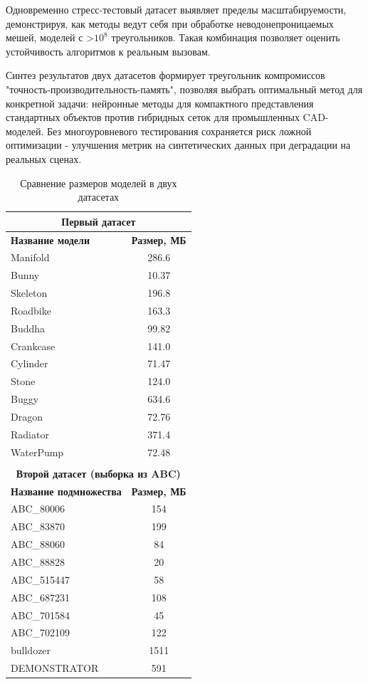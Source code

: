 \documentclass[a4paper,hidelinks,12pt]{article}
\begin{document}
Одновременно стресс-тестовый датасет выявляет пределы масштабируемости, демонстрируя, как методы ведут себя при обработке 
неводонепроницаемых мешей, моделей с >$10^8$ треугольников. Такая комбинация позволяет оценить устойчивость алгоритмов к реальным вызовам.

Синтез результатов двух датасетов формирует треугольник компромиссов "точность-производительность-память", 
позволяя выбрать оптимальный метод для конкретной задачи: нейронные методы для компактного представления стандартных 
объектов против гибридных сеток для промышленных CAD-моделей. Без многоуровневого тестирования сохраняется риск 
ложной оптимизации - улучшения метрик на синтетических данных при деградации на реальных сценах.

\begin{table}[h!]
	\centering
	\begin{tabular}{|l|c|}
			\hline
			\multicolumn{2}{|c|}{\textbf{Первый датасет}} \\
			\hline
			\textbf{Название модели} & \textbf{Размер, МБ} \\
			\hline
			Manifold     & 286.6 \\
			Bunny  & 10.37  \\
			Skeleton & 196.8 \\
			Roadbike & 163.3 \\
			Buddha     & 99.82 \\
			Crankcase & 141.0 \\
			Cylinder & 71.47 \\
			Stone & 124.0 \\
			Buggy & 634.6 \\
			Dragon & 72.76 \\
			Radiator & 371.4 \\
			WaterPump & 72.48 \\
			\hline
			\multicolumn{2}{c}{} \\[-1.5ex]
			\hline
			\multicolumn{2}{|c|}{\textbf{Второй датасет (выборка из ABC)}} \\
			\hline
			\textbf{Название подмножества} & \textbf{Размер, МБ} \\
			\hline
			ABC\_80006 & 154 \\
			ABC\_83870 & 199 \\
			ABC\_88060 & 84 \\
			ABC\_88828 & 20 \\
			ABC\_515447 & 58 \\
			ABC\_687231 & 108 \\
			ABC\_701584 & 45 \\
			ABC\_702109 & 122 \\
			bulldozer & 1511 \\
			DEMONSTRATOR & 591 \\
			\hline
	\end{tabular}
	\caption{Сравнение размеров моделей в двух датасетах}
	\label{tab:dataset_sizes}
\end{table}
\end{document}
